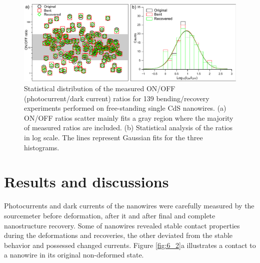 \begin{figure}  [t]
\includegraphics[width=\textwidth]{figures/figure6_3}
\caption[Statistical distribution of ON/OFF ratios]
{Statistical distribution of the measured ON/OFF (photocurrent/dark current) ratios for 139 bending/recovery experiments performed on free-standing single CdS nanowires. (a) ON/OFF ratios scatter mainly fits a gray region where the majority of measured ratios are included. (b) Statistical analysis of the ratios in log  scale. The lines represent Gaussian fits for the three histograms.
\label{fig:6_3}}
\end{figure}

\section{Results and discussions}
Photocurrents and dark currents of the nanowires were carefully measured by the sourcemeter before deformation, after it and after final and complete nanostructure recovery. 
Some of nanowires revealed stable contact properties during the deformations and recoveries, the other deviated from the stable behavior and possessed changed currents. 
Figure \ref{fig:6_2}a illustrates a contact to a nanowire in its original non-deformed state. \\

